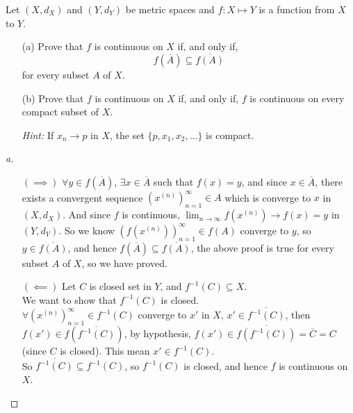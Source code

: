 
\begin{problem}[20pts]
  Let $(X,d_X)$ and $(Y,d_Y)$ be metric spaces and $f:X \mapsto Y$ is a function from $X$ to $Y$.
\begin{enumerate}

  \item[(a)] 
  Prove that $f$ is continuous on $X$ if, and only if,
\[
f(\overline{A}) \subseteq \overline{f(A)}
\]
for every subset $A$ of $X$.

  \item[(b)]  Prove that $f$ is continuous on $X$ if, and only if, $f$ is continuous on every compact subset of $X$.  

\textit{Hint:} If $x_n \to p$ in $X$, the set $\{p, x_1, x_2, \dots \}$ is compact.

 \end{enumerate}
\end{problem}

\begin{proof}[a]

\vphantom{text}
\begin{itemize}
    \item [\((\implies )\)] %
    $\forall y \in f(\overline{A})$, $\exists x \in \overline{A}$ such that $f(x) = y$, and since $x \in \overline{A}$, there exists a convergent sequence $(x^{(n)})_{n=1}^\infty \in A$ which is converge to $x$ in $(X, d_X)$. And since $f$ is continuous, $\lim_{n \to \infty} f(x^{(n)}) \to f(x) = y$ in $(Y, d_Y)$. So we know $(f(x^{(n)}))_{n=1}^\infty \in f(A)$ converge to $y$, so $y \in \overline{f(A)}$, and hence $f(\overline{A}) \subseteq \overline{f(A)}$, the above proof is true for every subset $A$ of $X$, so we have proved.
    \item [\((\impliedby )\)] Let $C$ is closed set in $Y$, and $f^{-1}(C) \subseteq X$. \\
    We want to show that $f^{-1}(C)$ is closed. \\
    $\forall (x^{(n)})_{n=1}^{\infty} \in f^{-1}(C)$ converge to $x'$ in $X$, $x' \in \overline{f^{-1}(C)}$, then $f(x') \in f(\overline{f^{-1}(C)})$, by hypothesis, $f(x') \in \overline{f(f^{-1}(C))} = \overline{C} = C$ (since $C$ is closed). This mean $x' \in f^{-1}(C)$. \\
    So $\overline{f^{-1}(C)} \subseteq f^{-1}(C)$, so $f^{-1}(C)$ is closed, and hence $f$ is continuous on $X$.
\end{itemize}
\end{proof}

